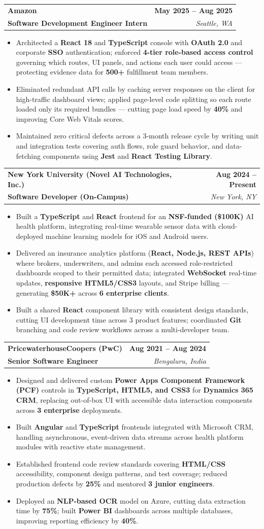 \documentclass[letterpaper,10pt]{article}
\makeatletter
\newcommand{\resumeItem}[1]{
\item\small{{#1}\vspace{-3.5pt}}
}
\newcommand{\resumeSubheading}[4]{
\vspace{6pt}
\item
\begin{tabular*}{1.0\textwidth}[t]{l@{\extracolsep{\fill}}r}
\textbf{#1} & \textbf{\small #2} \\
\textbf{\small#3} & \textit{\small #4} \\
\end{tabular*}\vspace{-5.5pt}
}
\newcommand{\resumeItemListStart}{\begin{itemize}[leftmargin=*, itemsep=0pt, topsep=0pt]}
\newcommand{\resumeItemListEnd}{\end{itemize}\vspace{-3pt}}
\makeatother
\begin{document}
\resumeSubheading
  {Amazon}{May 2025 -- Aug 2025}
  {Software Development Engineer Intern}{Seattle, WA}
\resumeItemListStart
  \resumeItem{Architected a \textbf{React 18} and \textbf{TypeScript} console with \textbf{OAuth 2.0} and corporate \textbf{SSO} authentication; enforced \textbf{4-tier role-based access control} governing which routes, UI panels, and actions each user could access — protecting evidence data for \textbf{500+} fulfillment team members.}
  \resumeItem{Eliminated redundant API calls by caching server responses on the client for high-traffic dashboard views; applied page-level code splitting so each route loaded only its required bundles — cutting page load speed by \textbf{40\%} and improving Core Web Vitals scores.}
  \resumeItem{Maintained zero critical defects across a 3-month release cycle by writing unit and integration tests covering auth flows, role guard behavior, and data-fetching components using \textbf{Jest} and \textbf{React Testing Library}.}
\resumeItemListEnd

\resumeSubheading
  {New York University (Novel AI Technologies, Inc.)}{Aug 2024 -- Present}
  {Software Developer (On-Campus)}{New York, NY}
\resumeItemListStart
  \resumeItem{Built a \textbf{TypeScript} and \textbf{React} frontend for an \textbf{NSF-funded (\$100K)} AI health platform, integrating real-time wearable sensor data with cloud-deployed machine learning models for iOS and Android users.}
  \resumeItem{Delivered an insurance analytics platform (\textbf{React, Node.js, REST APIs}) where brokers, underwriters, and admins each accessed role-restricted dashboards scoped to their permitted data; integrated \textbf{WebSocket} real-time updates, \textbf{responsive HTML5/CSS3} layouts, and Stripe billing — generating \textbf{\$50K+} across \textbf{6 enterprise clients}.}
  \resumeItem{Built a shared \textbf{React} component library with consistent design standards, cutting UI development time across 3 product features; coordinated \textbf{Git} branching and code review workflows across a multi-developer team.}
\resumeItemListEnd

\resumeSubheading
  {PricewaterhouseCoopers (PwC)}{Aug 2021 -- Aug 2024}
  {Senior Software Engineer}{Bengaluru, India}
\resumeItemListStart
  \resumeItem{Designed and delivered custom \textbf{Power Apps Component Framework (PCF)} controls in \textbf{TypeScript, HTML5, and CSS3} for \textbf{Dynamics 365 CRM}, replacing out-of-box UI with accessible data interaction components across \textbf{3 enterprise} deployments.}
  \resumeItem{Built \textbf{Angular} and \textbf{TypeScript} frontends integrated with Microsoft CRM, handling asynchronous, event-driven data streams across health platform modules with reactive state management.}
  \resumeItem{Established frontend code review standards covering \textbf{HTML/CSS} accessibility, component design patterns, and test coverage; reduced production defects by \textbf{25\%} and mentored \textbf{3 junior engineers}.}
  \resumeItem{Deployed an \textbf{NLP-based OCR} model on Azure, cutting data extraction time by \textbf{75\%}; built \textbf{Power BI} dashboards across multiple databases, improving reporting efficiency by \textbf{40\%}.}
\resumeItemListEnd
\end{document}
